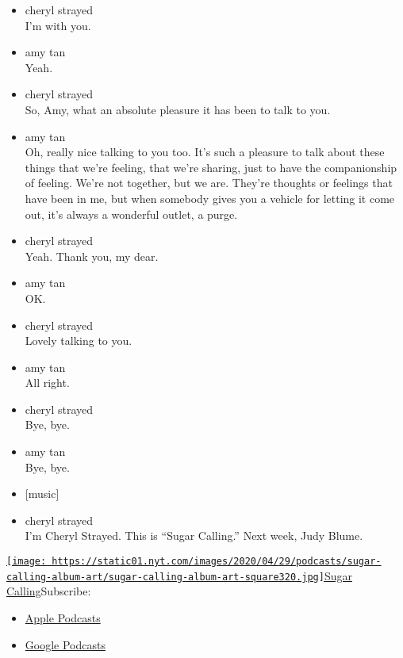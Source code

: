 \begin{itemize}
\item
  cheryl strayed\\
  I'm with you.
\item
  amy tan\\
  Yeah.
\item
  cheryl strayed\\
  So, Amy, what an absolute pleasure it has been to talk to you.
\item
  amy tan\\
  Oh, really nice talking to you too. It's such a pleasure to talk about
  these things that we're feeling, that we're sharing, just to have the
  companionship of feeling. We're not together, but we are. They're
  thoughts or feelings that have been in me, but when somebody gives you
  a vehicle for letting it come out, it's always a wonderful outlet, a
  purge.
\item
  cheryl strayed\\
  Yeah. Thank you, my dear.
\item
  amy tan\\
  OK.
\item
  cheryl strayed\\
  Lovely talking to you.
\item
  amy tan\\
  All right.
\item
  cheryl strayed\\
  Bye, bye.
\item
  amy tan\\
  Bye, bye.
\item
  {[}music{]}
\item
  cheryl strayed\\
  I'm Cheryl Strayed. This is ``Sugar Calling.'' Next week, Judy Blume.
\end{itemize}

\href{https://www.nytimes.com/column/sugar-calling}{\texttt{[image: https://static01.nyt.com/images/2020/04/29/podcasts/sugar-calling-album-art/sugar-calling-album-art-square320.jpg]}Sugar
Calling}Subscribe:

\begin{itemize}
\tightlist
\item
  \href{https://itunes.apple.com/us/podcast/id1505881384}{Apple
  Podcasts}
\item
  \href{https://podcasts.google.com/?feed=aHR0cHM6Ly9yc3MuYXJ0MTkuY29tL3N1Z2FyLWNhbGxpbmc\&ved=0CAUQrrcFahcKEwjA8Kyn09voAhUAAAAAHQAAAAAQBQ}{Google
  Podcasts}
\end{itemize}

